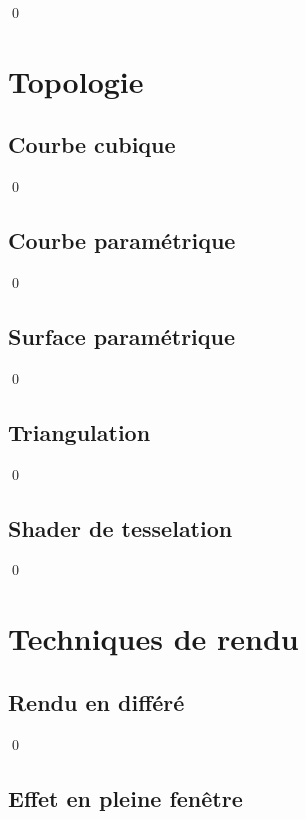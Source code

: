 \documentclass[12pt]{article}
\newcommand{\state}{\noindent}
\begin{document}
\qed

\pagebreak

\section{Topologie}

\subsection{Courbe cubique}

\state

\qed

\subsection{Courbe paramétrique}

\state

\qed

\subsection{Surface paramétrique}

\state

\qed

\subsection{Triangulation}

\state

\qed

\subsection{Shader de tesselation}

\state

\qed


\pagebreak

\section{Techniques de rendu}

\subsection{Rendu en différé}

\state

\qed

\subsection{Effet en pleine fenêtre}
\end{document}
